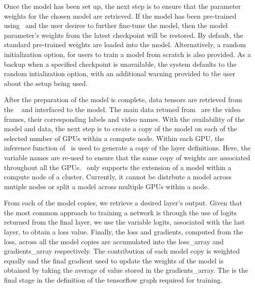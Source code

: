 \documentclass{llncs}
\begin{document}
Once the model has been set up, the next step is to ensure that the parameter weights for the chosen model are retrieved.
If the model has been pre-trained using \acro~and the user desires to further fine-tune the model, then the model parameter's weights from the latest checkpoint will be restored.
By default, the standard pre-trained weights are loaded into the model.
Alternatively, a random initialization option, for users to train a model from scratch is also provided.
As a backup when a specified checkpoint is unavailable, the system defaults to the random intialization option, with an additional warning provided to the user about the setup being used.

After the preparation of the model is complete, data tensors are retrieved from the \data~ and interfaced to the model.
The main data retuned from \data~are the video frames, their corresponding labels and video names.
With the availability of the model and data, the next step is to create a copy of the model on each of the selected number of GPUs within a compute node.
Within each GPU, the inference function of \model~is used to generate a copy of the layer definitions.
Here, the variable names are re-used to ensure that the same copy of weights are associated throughout all the GPUs.
\acro~only supports the extension of a model within a compute node of a cluster.
Currently, it cannot be distrbute a model across mutiple nodes or split a model across multiple GPUs within a node.

From each of the model copies, we retrieve a desired layer's output.
Given that the most common approach to training a network is through the use of logits returned from the final layer, we use the variable logits, associated with the last layer, to obtain a loss value.
Finally, the loss and gradients, computed from the loss, across all the model copies are accumulated into the loss\_array and gradients\_array respectively.
The contribution of each model copy is weighted equally and the final gradient used to update the weights of the model is obtained by taking the average of value stored in the gradients\_array.
The is the final stage in the definition of the tensorflow graph required for training.
\end{document}

